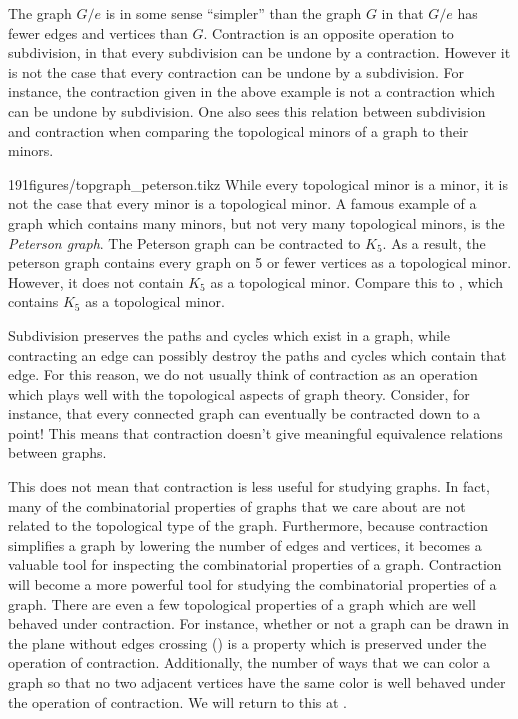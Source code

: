 The graph $G/e$ is in some sense ``simpler'' than the graph $G$ in that $G/e$ has fewer edges and vertices than $G$. 
Contraction is an opposite operation to subdivision, in that every subdivision can be undone by a contraction. 
However it is not the case that every contraction can be undone by a subdivision. 
For instance, the contraction given in the above example is not a contraction which can be undone by subdivision. 
One also sees this relation between subdivision and contraction when comparing the topological minors of a graph to their minors. 

\begin{examplefigureenv}{191figures/topgraph_peterson.tikz}
	While every topological minor is a minor, it is not the case that every minor is a topological minor.
	A famous example of a graph which contains many minors, but not very many topological minors, is the \emph{Peterson graph}.
		 The Peterson graph can be contracted to $K_5$. 
		 As a result, the peterson graph contains every graph on 5 or fewer vertices as a topological minor.
		However, it does not contain $K_5$ as a topological minor.
		Compare this to  , which contains $K_5$ as a topological minor. 
	\end{examplefigureenv}

Subdivision preserves the paths and cycles which exist in a graph, while contracting an edge can possibly destroy the paths and cycles which contain that edge. 
For this reason, we do not usually think of contraction as an operation which plays well with the topological aspects of graph theory. 
Consider, for instance, that every connected graph can eventually be contracted down to a point!
This means that contraction doesn't give meaningful equivalence relations between graphs.

This does not mean that contraction is less useful for studying graphs. In fact, many of the combinatorial properties of graphs that we care about are not related to the topological type of the graph. Furthermore, because contraction simplifies a graph by lowering the number of edges and vertices, it becomes a valuable tool for inspecting the combinatorial properties of a graph.
	 Contraction will become a more powerful tool for studying the combinatorial properties of a graph.
	 There are even a few topological properties of a graph which are well behaved under contraction.
	 For instance, whether or not a graph can be drawn in the plane  without edges crossing () is a property which is preserved under the operation of contraction.
 	Additionally, the number of ways that we can color a graph so that no two adjacent vertices have the same color is well behaved under the operation of contraction.
 	We will return to this at .

